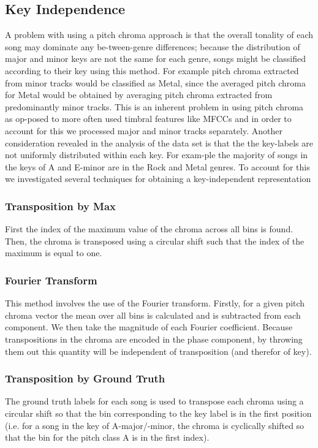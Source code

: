 \documentclass{article}
\begin{document}
\subsection{Key Independence}
A problem with using a pitch chroma approach is that the overall tonality of each song may dominate any be-tween-genre differences; because the distribution of major and minor keys are not the same for each genre, songs might be classified according to their key using this method. For example pitch chroma extracted from minor tracks would be classified as Metal, since the averaged pitch chroma for Metal would be obtained by averaging pitch chroma extracted from predominantly minor tracks. This is an inherent problem in using pitch chroma as op-posed to more often used timbral features like MFCCs and in order to account for this we processed major and minor tracks separately. Another consideration revealed in the analysis of the data set is that the the key-labels are not uniformly distributed within each key. For exam-ple the majority of songs in the keys of A and E-minor are in the Rock and Metal genres. To account for this we investigated several techniques for obtaining a key-independent representation

\subsubsection{Transposition by Max}
First the index of the maximum value of the chroma across all bins is found. Then, the chroma is transposed using a circular shift such that the index of the maximum is equal to one.

\subsubsection{Fourier Transform}
This method involves the use of the Fourier transform. Firstly, for a given pitch chroma vector the mean over all bins is calculated and is subtracted from each component. We then take the magnitude of each Fourier coefficient. Because transpositions in the chroma are encoded in the phase component, by throwing them out this quantity will be independent of transposition (and therefor of key).

\subsubsection{Transposition by Ground Truth}
The ground truth labels for each song is used to transpose each chroma using a circular shift so that the bin corresponding to the key label is in the first position (i.e. for a song in the key of A-major/-minor, the chroma is cyclically shifted so that the bin for the pitch class A is in the first index).
\end{document}
